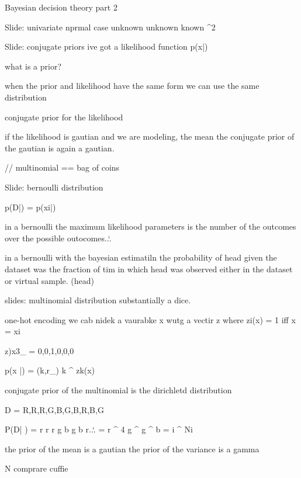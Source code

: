 Bayesian decision theory part 2

Slide: univariate nprmal case unknown unknown \mu known \sigma ^2

Slide: conjugate priors
ive got a likelihood function p(x|\sigma)

what is a prior?

when the prior and likelihood have the same form we can use the same distribution

conjugate prior for the likelihood 

if the likelihood is gautian and we are modeling, the mean the conjugate prior of the gautian is again a gautian.

// multinomial == bag of coins



Slide: bernoulli distribution

p(D|\theta) = \product p(xi|\theta)

in a bernoulli the maximum likelihood parameters is the number of the outcomes over the possible outocomes..`.

in a bernoulli with the bayesian estimatiln
	the probability of head given the dataset was the fraction of tim in which head was observed either in the dataset or virtual sample. (\alpha head)



slides: multinomial distribution
substantially a dice.

one-hot encoding
we cab nidek a vaurabke x wutg a vectir z 
where zi(x) = 1 iff x = xi

z)x3_ = {0,0,1,0,0,0}

p(x |\thera) = \product (k,r_) \theta k ^ zk(x)


conjugate prior of the multinomial is the dirichletd distribution


D = {R,R,R,G,B,G,B,R,B,G}

P(D| \theta) = \theta r \theta r \theta r \theta g \theta b \theta g \theta b \theta r..`.
 = \theta r ^ 4 \theta g ^ g \theta ^ b = \product \theta i ^ Ni


the prior of the mean is a gautian
the prior of the variance is a gamma

N comprare cuffie